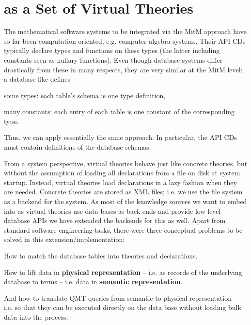 \section{\lmfdb as a Set of Virtual Theories}\label{sec:vt}

The mathematical software systems to be integrated via the MitM approach have so far been computation-oriented, e.g. computer algebra systems.
Their API CDs typically declare types and functions on these types (the latter including constants seen as nullary functions).
Even though database systems differ drastically from these in many respects, they are very similar at the MitM level: a database like \lmfdb defines
\begin{compactitem}
 \item some types: each table's schema is one type definition,
 \item many constants: each entry of each table is one constant of the corresponding type.
\end{compactitem}
Thus, we can apply essentially the same approach.
In particular, the API CDs must contain definitions of the database schemas. 

From a system perspective, virtual theories behave just like concrete theories, but without the assumption of loading all declarations from a file on disk at system startup.
Instead, virtual theories load declarations in a lazy fashion when they are needed. 
Concrete theories are stored as XML files; i.e. we use the file system as a backend for the \mmt system. 
As most of the knowledge sources we want to embed into \ommt as virtual theories use data-bases as back-ends and provide low-level database APIs we have extended the \mmt backends for this as well.
Apart from standard software engineering tasks, there were three conceptual problems to be solved in this extension/implementation:
\begin{compactenum}[\bf P1]
\item How to match the database tables into \ommt theories and declarations. 
\item How to lift data in \textbf{physical representation} -- i.e. as records of the
  underlying database to \ommt terms -- i.e. data in \textbf{semantic representation}.
\item And how to translate QMT queries from semantic to physical representation -- i.e. so
  that they can be executed directly on the data base without loading bulk data into the
  \mmt process.
\end{compactenum}

